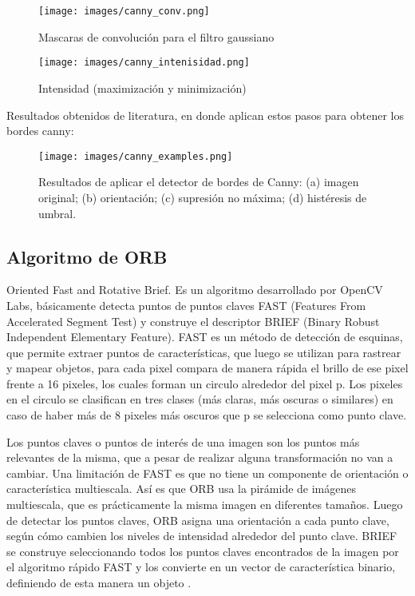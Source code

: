 \documentclass{article}
\begin{document}
\begin{figure}[!ht]
  \centering
  \texttt{[image: images/canny\_conv.png]}
  \caption{Mascaras de convolución para el filtro gaussiano}
\end{figure}

\begin{figure}[!ht]
  \centering
  \texttt{[image: images/canny\_intenisidad.png]}
  \caption{Intensidad (maximización y minimización)}
\end{figure}

Resultados obtenidos de literatura, en donde aplican estos pasos para obtener los bordes canny:
\begin{figure}[!ht]
  \centering
  \texttt{[image: images/canny\_examples.png]}
  \caption{Resultados de aplicar el detector de bordes de Canny: (a) imagen original; (b)
    orientación; (c) supresión no máxima; (d) histéresis de umbral.}
\end{figure}

\subsection*{Algoritmo de ORB}
Oriented Fast and Rotative Brief. Es un algoritmo desarrollado por OpenCV Labs, básicamente detecta puntos de puntos claves FAST (Features From Accelerated Segment Test) y construye el descriptor BRIEF (Binary Robust Independent Elementary Feature).
FAST es un método de detección de esquinas, que permite extraer puntos de características, que luego se utilizan para rastrear y mapear objetos, para cada pixel compara de manera rápida el brillo de ese pixel frente a 16 pixeles, los cuales forman un circulo alrededor del pixel p. Los pixeles en el circulo se clasifican en tres clases (más claras, más oscuras o similares) en caso de haber más de 8 pixeles más oscuros que p se selecciona como punto clave.

Los puntos claves o puntos de interés de una imagen son los puntos más relevantes de la misma, que a pesar de realizar alguna transformación no van a
cambiar.
Una limitación de FAST es que no tiene un componente de orientación o característica multiescala. Así es que ORB usa la pirámide de imágenes multiescala,
que es prácticamente la misma imagen en diferentes tamaños. Luego de detectar
los puntos claves, ORB asigna una orientación a cada punto clave, según cómo
cambien los niveles de intensidad alrededor del punto clave. BRIEF se construye
seleccionando todos los puntos claves encontrados de la imagen por el algoritmo
rápido FAST y los convierte en un vector de característica binario, definiendo
de esta manera un objeto \cite{core_detection_biomedical}.
\end{document}
